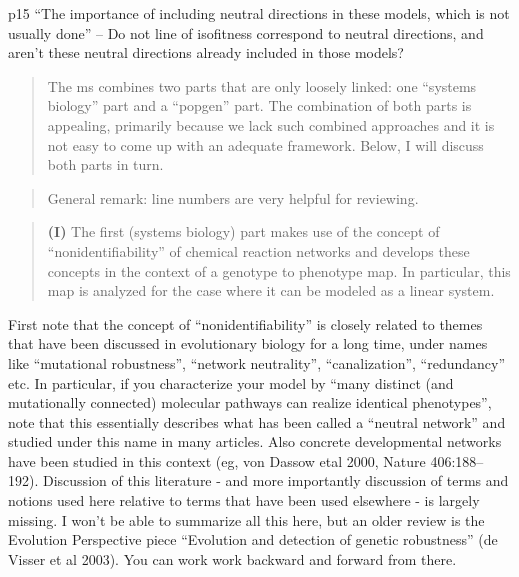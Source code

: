 
\begin{point}{p15}
    ``The importance of including neutral directions in these models, which
is not usually done'' -- Do not line of isofitness correspond to neutral
directions, and aren't these neutral directions already included in those
models?
\end{point}





\begin{quote}
The ms combines two parts that are only loosely linked: one ``systems biology''
part and a ``popgen'' part. The combination of both parts is appealing, primarily
because we lack such combined approaches and it is not easy to come up with an
adequate framework. Below, I will discuss both parts in turn.
\end{quote}

\begin{quote}
General remark: line numbers are very helpful for reviewing.  
\end{quote}

\begin{quote}
    \textbf{(I)} The first (systems biology) part makes use of the concept of
``nonidentifiability'' of chemical reaction networks and develops these concepts
in the context of a genotype to phenotype map. In particular, this map is
analyzed for the case where it can be modeled as a linear system.
\end{quote}

\begin{point}{}
    First note that the concept of ``nonidentifiability'' is closely related to
themes that have been discussed in evolutionary biology for a long time, under
names like ``mutational robustness'', ``network neutrality'', ``canalization'',
``redundancy'' etc. In particular, if you characterize your model by ``many
distinct (and mutationally connected) molecular pathways can realize identical
phenotypes'', note that this essentially describes what has been called a
``neutral network'' and studied under this name in many articles. Also concrete
developmental networks have been studied in this context (eg, von Dassow etal
2000, Nature 406:188–192). Discussion of this literature - and more importantly
discussion of terms and notions used here relative to terms that have been used
elsewhere - is largely missing. I won't be able to summarize all this here, but
an older review is the Evolution Perspective piece ``Evolution and detection of
genetic robustness'' (de Visser et al 2003). You can work work backward and
forward from there.  
\end{point}

